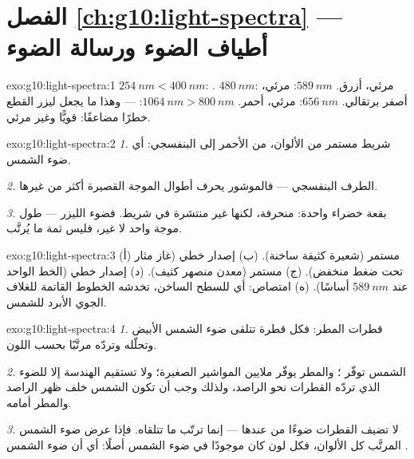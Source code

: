 \section*{الفصل \ref{ch:g10:light-spectra} --- أطياف الضوء ورسالة الضوء}

\begin{solution}{exo:g10:light-spectra:1}
$\qty{254}{nm} < \qty{400}{nm}$: . $\qty{480}{nm}$: مرئي،
أزرق. $\qty{589}{nm}$: مرئي، أصفر برتقالي. $\qty{656}{nm}$: مرئي،
أحمر. $\qty{1064}{nm} > \qty{800}{nm}$:  --- وهذا ما يجعل ليزر
القطع خطرًا مضاعفًا: قويًّا وغير مرئي.
\end{solution}

\begin{solution}{exo:g10:light-spectra:2}
\emph{1.} شريط مستمر من الألوان، من الأحمر إلى البنفسجي: أي 
ضوء الشمس.

\emph{2.} الطرف البنفسجي --- فالموشور يحرف أطوال الموجة القصيرة
أكثر من غيرها.

\emph{3.} بقعة خضراء واحدة: منحرفة، لكنها غير منتشرة في شريط.
فضوء الليزر  --- طول موجة واحد لا غير، فليس ثمة ما
يُرتَّب.
\end{solution}

\begin{solution}{exo:g10:light-spectra:3}
(أ) مستمر (شعيرة كثيفة ساخنة). (ب) إصدار خطي (غاز مثار
تحت ضغط منخفض). (ج) مستمر (معدن منصهر كثيف). (د) إصدار خطي
(الخط الواحد عند $\qty{589}{nm}$ أساسًا). (ه) امتصاص: أي
 للسطح الساخن، تخدشه الخطوط القاتمة
للغلاف الجوي الأبرد للشمس.
\end{solution}

\begin{solution}{exo:g10:light-spectra:4}
\emph{1.} قطرات المطر: فكل قطرة تتلقى ضوء الشمس الأبيض وتحلّله
وتردّه مرتَّبًا بحسب اللون.

\emph{2.} الشمس توفّر ؛ والمطر يوفّر ملايين
المواشير الصغيرة؛ ولا تستقيم الهندسة إلا للضوء الذي تردّه القطرات
نحو الراصد، ولذلك وجب أن تكون الشمس خلف ظهر الراصد
والمطر أمامه.

\emph{3.} لا تضيف القطرات ضوءًا من عندها --- إنما ترتّب ما
تتلقاه. فإذا عرض ضوء الشمس المرتَّب كل الألوان، فكل لون
كان موجودًا في ضوء الشمس أصلًا: أي أن ضوء الشمس .
\end{solution}

